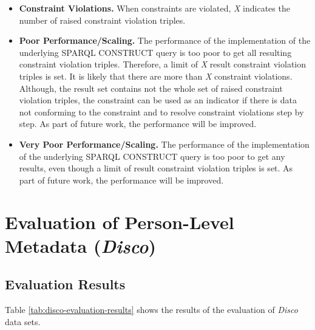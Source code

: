 \documentclass{llncs}
\begin{document}
\begin{itemize}
	\item \textbf{Constraint Violations.}
When constraints are violated, 
\emph{X} indicates the number of raised constraint violation triples. 

  \item
\textbf{Poor Performance/Scaling.}
The performance of the implementation of the underlying SPARQL CONSTRUCT query 
is too poor to get all resulting constraint violation triples. 
Therefore, a limit of \emph{X} result constraint violation triples is set. 
It is likely that there are more than \emph{X} constraint violations.
Although, the result set contains not the whole set of raised constraint violation triples,
the constraint can be used as an indicator if there is data not conforming to the constraint and
to resolve constraint violations step by step. 
As part of future work, the performance will be improved.

  \item
\textbf{Very Poor Performance/Scaling.} 
The performance of the implementation of the underlying SPARQL CONSTRUCT query 
is too poor to get any results, even though a limit of result constraint violation triples is set. 
As part of future work, the performance will be improved. 
\end{itemize}

\section{Evaluation of Person-Level Metadata (\emph{Disco})}

\subsection{Evaluation Results}

Table \ref{tab:disco-evaluation-results} shows the results of the evaluation of \emph{Disco} data sets.
\end{document}

